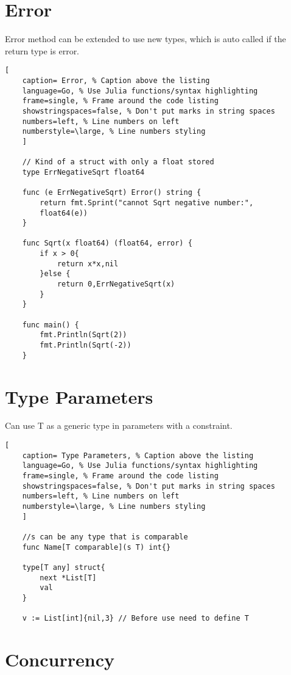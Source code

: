 \documentclass[11pt]{scrartcl} %
\begin{document}
\section{Error}

Error method can be extended to use new types, which is auto called if the return type is error.

\begin{lstlisting}[
	caption= Error, % Caption above the listing
	language=Go, % Use Julia functions/syntax highlighting
	frame=single, % Frame around the code listing
	showstringspaces=false, % Don't put marks in string spaces
	numbers=left, % Line numbers on left
	numberstyle=\large, % Line numbers styling
	]

	// Kind of a struct with only a float stored
	type ErrNegativeSqrt float64 

	func (e ErrNegativeSqrt) Error() string {
		return fmt.Sprint("cannot Sqrt negative number:",
		float64(e))
	}

	func Sqrt(x float64) (float64, error) {
		if x > 0{
			return x*x,nil
		}else {
			return 0,ErrNegativeSqrt(x)
		}
	}

	func main() {
		fmt.Println(Sqrt(2))
		fmt.Println(Sqrt(-2))
	}

\end{lstlisting}

\section{Type Parameters}

Can use T as a generic type in parameters with a constraint.

\begin{lstlisting}[
	caption= Type Parameters, % Caption above the listing
	language=Go, % Use Julia functions/syntax highlighting
	frame=single, % Frame around the code listing
	showstringspaces=false, % Don't put marks in string spaces
	numbers=left, % Line numbers on left
	numberstyle=\large, % Line numbers styling
	]

	//s can be any type that is comparable
	func Name[T comparable](s T) int{} 

	type[T any] struct{
		next *List[T]
		val
	} 
	
	v := List[int]{nil,3} // Before use need to define T

\end{lstlisting}

\section{Concurrency}
\end{document}
